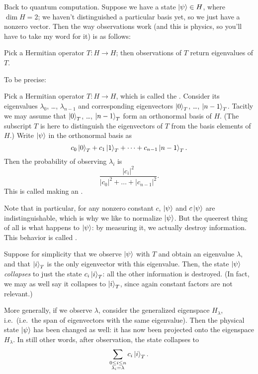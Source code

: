 \documentclass[11pt]{scrreprt}
\begin{document}
Back to quantum computation.
Suppose we have a state $\ket\psi \in H$, where $\dim H = 2$;
we haven't distinguished a particular basis yet,
so we just have a nonzero vector.
Then the way observations work (and this is physics, so you'll have to
take my word for it) is as follows:
\begin{moral}
	Pick a Hermitian operator $T : H \to H$;
	then observations of $T$ return eigenvalues of $T$.
\end{moral}
To be precise:
\begin{itemize}
	\ii Pick a Hermitian operator $T : H \to H$,
	which is called the .
	\ii Consider its eigenvalues $\lambda_0$, \dots, $\lambda_{n-1}$
	and corresponding eigenvectors $\ket{0}_T$, \dots, $\ket{n-1}_T$.
	Tacitly we may assume that $\ket{0}_T$, \dots, $\ket{n-1}_T$ form
	an orthonormal basis of $H$.
	(The subscript $T$ is here to distinguish the eigenvectors of $T$
	from the basis elements of $H$.)
	\ii Write $\ket\psi$ in the orthonormal basis as
	\[ c_0\ket0_T + c_1\ket1_T + \dots + c_{n-1}\ket{n-1}_T. \]
	\ii Then the probability of observing $\lambda_i$ is
	\[ \frac{|c_i|^2}{|c_0|^2 + \dots + |c_{n-1}|^2}. \]
	This is called making an .
\end{itemize}
Note that in particular, for any nonzero constant $c$,
$\ket\psi$ and $c\ket\psi$ are indistinguishable,
which is why we like to normalize $\ket\psi$.
But the queerest thing of all is what happens to $\ket\psi$:
by measuring it, we actually destroy information.
This behavior is called .
\begin{itemize}
	\ii Suppose for simplicity that we observe $\ket\psi$
	with $T$ and obtain an eigenvalue $\lambda$,
	and that $\ket{i}_T$ is the only eigenvector with this eigenvalue.
	Then, the state $\ket\psi$ \emph{collapses} to just the state
	$c_i \ket{i}_T$: all the other information is destroyed.
	(In fact, we may as well say it collapses to $\ket{i}_T$,
	since again constant factors are not relevant.)

	\ii	More generally, if we observe $\lambda$,
	consider the generalized eigenspace $H_\lambda$, i.e.\
	(i.e.\ the span of eigenvectors with the same eigenvalue).
	Then the physical state $\ket\psi$ has been changed as well:
	it has now been projected onto the eigenspace $H_\lambda$.
	In still other words, after observation, the state collapses to
	\[
		\sum_{\substack{0 \le i \le n \\ \substack{\lambda_i = \lambda}}}
		c_i \ket{i}_T.
	\]
\end{itemize}
\end{document}
